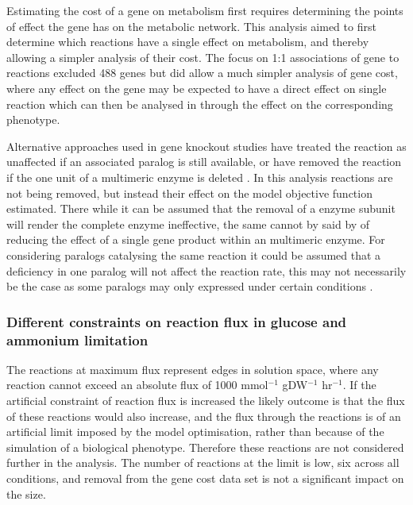 Estimating the cost of a gene on metabolism first requires determining the points of effect the gene has on the metabolic network. This analysis aimed to first determine which reactions have a single effect on metabolism, and thereby allowing a simpler analysis of their cost. The focus on 1:1 associations of gene to reactions excluded 488 genes but did allow a much simpler analysis of gene cost, where any effect on the gene may be expected to have a direct effect on single reaction which can then be analysed in through the effect on the corresponding phenotype.

Alternative approaches used in gene knockout studies have treated the reaction as unaffected if an associated paralog is still available, or have removed the reaction if the one unit of a multimeric enzyme is deleted \cite{pal2006}. In this analysis reactions are not being removed, but instead their effect on the model objective function estimated. There while it can be assumed that the removal of a enzyme subunit will render the complete enzyme ineffective, the same cannot by said by of reducing the effect of a single gene product within an multimeric enzyme. For considering paralogs catalysing the same reaction it could be assumed that a deficiency in one paralog will not affect the reaction rate, this may not necessarily be the case as some paralogs may only expressed under certain conditions \cite{carlson2007,perez2008}.



\subsubsection{Different constraints on reaction flux in glucose and ammonium limitation}

The reactions at maximum flux represent edges in solution space, where any reaction cannot exceed an absolute flux of 1000 mmol$^{-1}$ gDW$^{-1}$ hr$^{-1}$. If the artificial constraint of reaction flux is increased the likely outcome is that the flux of these reactions would also increase, and the flux through the reactions is of an artificial limit imposed by the model optimisation, rather than because of the simulation of a biological phenotype. Therefore these reactions are not considered further in the analysis. The number of reactions at the limit is low, six across all conditions, and removal from the gene cost data set is not a significant impact on the size.

